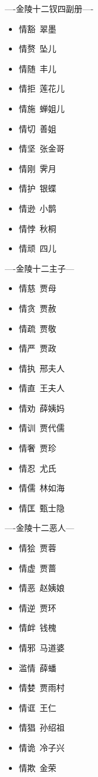 \documentclass[12pt,oneside]{book}
\begin{document}
----金陵十二钗四副册----


\begin{itemize}
\item 情豁~翠墨
\item 情赘~坠儿
\item 情随~丰儿
\item 情拒~莲花儿
\item 情施~蝉姐儿
\item 情切~善姐
\item 情坚~张金哥
\item 情刚~霁月
\item 情护~银蝶
\item 情逊~小鹊
\item 情悖~秋桐
\item 情顽~四儿
\end{itemize}



----金陵十二主子---


\begin{itemize}
\item 情慈~贾母
\item 情贪~贾赦
\item 情疏~贾敬
\item 情严~贾政
\item 情执~邢夫人
\item 情直~王夫人
\item 情劝~薛姨妈
\item 情训~贾代儒 
\item 情奢~贾珍
\item 情忍~尤氏 
\item 情儒~林如海
\item 情匡~甄士隐
\end{itemize}


----金陵十二恶人---


\begin{itemize}
\item 情狯~贾蓉
\item 情虚~贾蔷
\item 情恶~赵姨娘
\item 情逆~贾环
\item 情衅~钱槐
\item 情邪~马道婆
\item 滥情~薛蟠
\item 情婪~贾雨村
\item 情诓~王仁
\item 情猖~孙绍祖
\item 情诡~冷子兴
\item 情欺~金荣 
\end{itemize}
\end{document}
